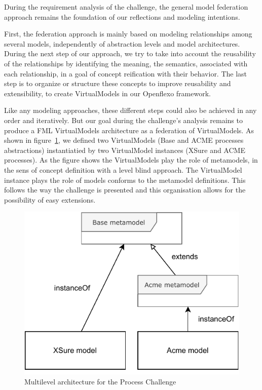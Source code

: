 
During the requirement analysis of the challenge, the general model federation approach remains the foundation of our reflections and modeling intentions. 

First, the federation approach is mainly based on modeling relationships among several models, independently of abstraction levels and model architectures.
During the next step of our approach, we try to take into account the reusability of the relationships by identifying the meaning, the semantics, associated with each relationship, in a goal of concept reification with their behavior. The last step is to organize or structure these concepts to improve reusability and extensibility, to create VirtualModels in our Openflexo framework.     

Like any modeling approaches, these different steps could also be achieved in any order and iteratively. But our goal during the challenge's analysis remains to produce a FML VirtualModels architecture as a federation of VirtualModels. 
As shown in figure~\ref{fig:MultilevelArchitecture}, we defined two VirtualModels (Base and ACME processes abstractions) instantiatied by two VirtualModel instances (XSure and ACME processes). As the figure shows the VirtualModels play the role of metamodels, in the sens of concept definition with a level blind approach. The VirtualModel instance plays the role of models conforms to the metamodel definitions. 
This follows the way the challenge is presented and this organisation allows for the possibility of easy extensions.

\begin{figure}
    \centering
    \includegraphics[width=0.7 \columnwidth]{Figures/MultilevelArchitecture.pdf}
    \caption{Multilevel architecture for the Process Challenge}
    \label{fig:MultilevelArchitecture}
\end{figure}

